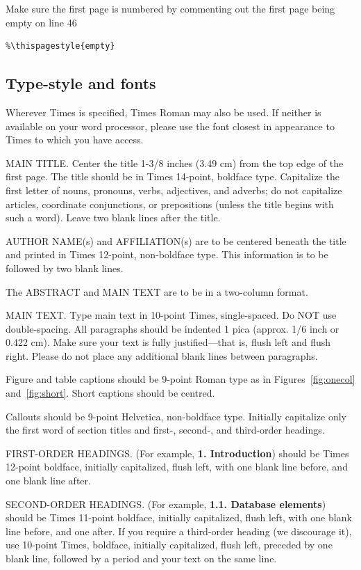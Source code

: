 \documentclass[10pt,twocolumn,a4paper]{article}
\begin{document}
Make sure the first page is numbered by commenting out the first page being
empty on line 46
\begin{verbatim}
%\thispagestyle{empty}
\end{verbatim}


\subsection{Type-style and fonts}

Wherever Times is specified, Times Roman may also be used. If neither is
available on your word processor, please use the font closest in
appearance to Times to which you have access.

MAIN TITLE. Center the title 1-3/8 inches (3.49 cm) from the top edge of
the first page. The title should be in Times 14-point, boldface type.
Capitalize the first letter of nouns, pronouns, verbs, adjectives, and
adverbs; do not capitalize articles, coordinate conjunctions, or
prepositions (unless the title begins with such a word). Leave two blank
lines after the title.

AUTHOR NAME(s) and AFFILIATION(s) are to be centered beneath the title
and printed in Times 12-point, non-boldface type. This information is to
be followed by two blank lines.

The ABSTRACT and MAIN TEXT are to be in a two-column format.

MAIN TEXT. Type main text in 10-point Times, single-spaced. Do NOT use
double-spacing. All paragraphs should be indented 1 pica (approx. 1/6
inch or 0.422 cm). Make sure your text is fully justified---that is,
flush left and flush right. Please do not place any additional blank
lines between paragraphs.

Figure and table captions should be 9-point Roman type as in
Figures~\ref{fig:onecol} and~\ref{fig:short}.  Short captions should be centred.

\noindent Callouts should be 9-point Helvetica, non-boldface type.
Initially capitalize only the first word of section titles and first-,
second-, and third-order headings.

FIRST-ORDER HEADINGS. (For example, {\large \bf 1. Introduction})
should be Times 12-point boldface, initially capitalized, flush left,
with one blank line before, and one blank line after.

SECOND-ORDER HEADINGS. (For example, { \bf 1.1. Database elements})
should be Times 11-point boldface, initially capitalized, flush left,
with one blank line before, and one after. If you require a third-order
heading (we discourage it), use 10-point Times, boldface, initially
capitalized, flush left, preceded by one blank line, followed by a period
and your text on the same line.
\end{document}

